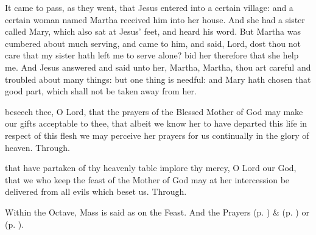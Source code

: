  It came to pass, as they went, that Jesus entered into a certain village: and a certain woman named Martha received him into her house. And she had a sister called Mary, which also sat at Jesus' feet, and heard his word. But Martha was cumbered about much serving, and came to him, and said, Lord, dost thou not care that my sister hath left me to serve alone? bid her therefore that she help me. And Jesus answered and said unto her, Martha, Martha, thou art careful and troubled about many things: but one thing is needful: and Mary hath chosen that good part, which shall not be taken away from her.


\secret
{} beseech thee, O Lord, that the prayers of the Blessed Mother of God may make our gifts acceptable to thee, that albeit we know her to have departed this life in respect of this flesh we may perceive her prayers for us continually in the glory of heaven. Through.


\postcommunion
{} that have partaken of thy heavenly table implore thy mercy, O Lord our God, that we who keep the feast of the Mother of God may at her intercession be delivered from all evils which beset us. Through.

\begin{rubric}
    Within the Octave, Mass is said as on the Feast. And the  Prayers  (p. \pageref{SPHolyGhost}) \&   (p. \pageref{SPAgainst}) or  (p. \pageref{SPChiefBishop}).
\end{rubric}


\clearpage
{}


